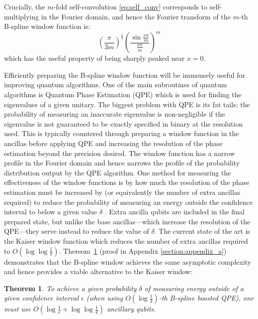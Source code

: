 \documentclass[a4paper,twocolumn,,accepted=2025-05-27]{quantumarticle}
\newtheorem{theorem}{Theorem}
\theoremstyle{empty}
\begin{document}
  Crucially, the $m$-fold self-convolution \eqref{eq:self_conv} corresponds to self-multiplying in the Fourier domain, and hence the Fourier transform of the $m$-th B-spline window function is:
\begin{equation}
     \left(\frac{\pi}{3m}\right)^{\frac{1}{4}}\left(\frac{\sin \frac{x\pi}{m}}{ \frac{x\pi}{m}}\right)^m
\end{equation}
which has the useful property of being sharply peaked near $x=0$.


Efficiently preparing the B-spline window function will be immensely useful for improving quantum algorithms. One of the main subroutines of quantum algorithms is Quantum Phase Estimation (QPE) which is used for finding the eigenvalues of a given unitary. The biggest problem with QPE is its fat tails; the probability of measuring an inaccurate eigenvalue is non-negligible if the eigenvalue is not guaranteed to be exactly specified in binary at the resolution used. This is typically countered through preparing a window function in the ancillas before applying QPE and increasing the resolution of the phase estimation beyond the precision desired. The window function has a narrow profile in the Fourier domain and hence narrows the profile of the probability distribution output by the QPE algorithm. One method for measuring the effectiveness of the window functions is by how much the resolution of the phase estimation must be increased by (or equivalently the number of extra ancillas required) to reduce the probability of measuring an energy outside the confidence interval to below a given value $\delta$ \cite{Greenaway:2024jzs}. Extra ancilla qubits are included in the final prepared state, but unlike the base ancillas—which increase the resolution of the QPE—they serve instead to reduce the value of $\delta$. The current state of the art is the Kaiser window function \cite{Berry:2022ccu} which reduces the number of extra ancillas required to $O(\log \log \frac{1}{\delta})$. Thereom~\ref{theroem:b_spline} (proof in Appendix \ref{section:appendix_a}) demonstrates that the B-spline window achieves the same asymptotic complexity and hence provides a viable alternative to the Kaiser window: 

\begin{theorem}
\label{theroem:b_spline}
To achieve a given probability $\delta$ of measuring energy outside of a given confidence interval $\epsilon$ (when using $O(\log \frac{1}{\delta})$-th B-spline boosted QPE), one must use $O(\log \frac{1}{\epsilon} + \log \log \frac{1}{\delta})$ ancillary qubits.
\end{theorem}
\end{document}
